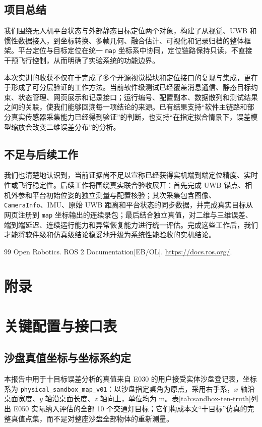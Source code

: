 \documentclass[UTF8,a4paper,12pt]{ctexart}
\begin{document}
\subsection{项目总结}
我们围绕无人机平台状态与外部静态目标定位两个对象，构建了从视觉、UWB 和惯性数据接入，到坐标转换、多帧几何、融合估计、可视化和记录归档的整体框架。平台定位与目标定位在统一 \texttt{map} 坐标系中协同，定位链路保持只读，不直接干预飞行控制，从而明确了实验系统的功能边界。

本次实训的收获不仅在于完成了多个开源视觉模块和定位接口的复现与集成，更在于形成了可分层验证的工作方法。当前软件级测试已经覆盖消息通信、静态目标约束、状态管理、网页展示和记录接口；运行编号、配置副本、数据散列和测试结果之间的关联，使我们能够回溯每一项结论的来源。已有结果支持“软件主链路和部分真实传感器采集能力已经得到验证”的判断，也支持“在指定拟合情景下，误差模型缩放会改变二维误差分布”的分析。

\subsection{不足与后续工作}
我们也清楚地认识到，当前证据尚不足以宣称已经获得实机端到端定位精度、实时性或飞行稳定性。后续工作将围绕真实联合验收展开：首先完成 UWB 锚点、相机外参和平台初始位姿的独立测量与配置核验；其次采集包含图像、\texttt{CameraInfo}、IMU、原始 UWB 距离和平台状态的同步数据，并完成真实目标从网页注册到 \texttt{map} 坐标输出的连续录包；最后结合独立真值，对二维与三维误差、端到端延迟、连续运行能力和异常恢复能力进行统一评估。完成这些工作后，我们才能将软件级和仿真级结论稳妥地升级为系统性能验收的实机结论。

\begin{thebibliography}{99}
   Open Robotics. ROS 2 Documentation[EB/OL]. \url{https://docs.ros.org/}.
\end{thebibliography}

\clearpage
\appendix
\section*{附录}
\section{关键配置与接口表}
\subsection{沙盘真值坐标与坐标系约定}
本报告中用于十目标误差分析的真值来自 E030 的用户接受实体沙盘登记表，坐标系为 \texttt{physical\_sandbox\_map\_v01}：以沙盘指定桌角为原点，采用右手系，$x$ 轴沿桌面宽度、$y$ 轴沿桌面长度、$z$ 轴向上，单位均为 m。表\ref{tab:sandbox-ten-truth}列出 E050 实际纳入评估的全部 10 个交通灯目标；它们构成本文“十目标”仿真的完整真值点集，而不是对整座沙盘全部物体的重新测量。
\end{document}
